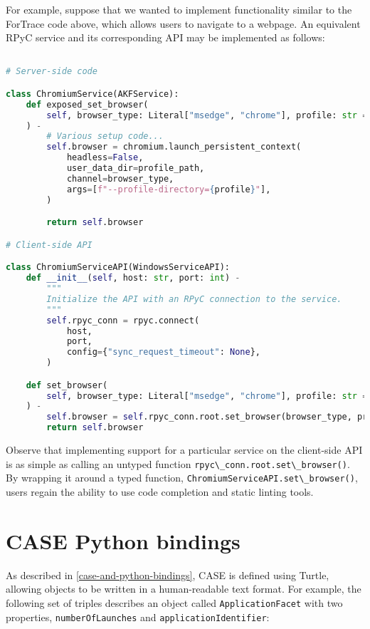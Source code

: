 \documentclass[letterpaper,12pt]{report}
\newcommand{\passthrough}[1]{#1}
\begin{document}
For example, suppose that we wanted to implement functionality similar
to the ForTrace code above, which allows users to navigate to a webpage.
An equivalent RPyC service and its corresponding API may be implemented
as follows:

\begin{lstlisting}[language=Python]

# Server-side code

class ChromiumService(AKFService):
    def exposed_set_browser(
        self, browser_type: Literal["msedge", "chrome"], profile: str = "Default"
    ) -
        # Various setup code...
        self.browser = chromium.launch_persistent_context(
            headless=False,
            user_data_dir=profile_path,
            channel=browser_type,
            args=[f"--profile-directory={profile}"],
        )

        return self.browser

# Client-side API

class ChromiumServiceAPI(WindowsServiceAPI):
    def __init__(self, host: str, port: int) -
        """
        Initialize the API with an RPyC connection to the service.
        """
        self.rpyc_conn = rpyc.connect(
            host,
            port,
            config={"sync_request_timeout": None},
        )

    def set_browser(
        self, browser_type: Literal["msedge", "chrome"], profile: str = "Default"
    ) -
        self.browser = self.rpyc_conn.root.set_browser(browser_type, profile)
        return self.browser
\end{lstlisting}

Observe that implementing support for a particular service on the
client-side API is as simple as calling an untyped function
\passthrough{\lstinline!rpyc\_conn.root.set\_browser()!}. By wrapping it
around a typed function,
\passthrough{\lstinline!ChromiumServiceAPI.set\_browser()!}, users
regain the ability to use code completion and static linting tools.

\section{CASE Python bindings}\label{case-python-bindings}

As described in \autoref{case-and-python-bindings}, CASE is defined using Turtle, allowing objects to be
written in a human-readable text format. For example, the following set
of triples describes an object called
\passthrough{\lstinline!ApplicationFacet!} with two properties,
\passthrough{\lstinline!numberOfLaunches!} and
\passthrough{\lstinline!applicationIdentifier!}:
\end{document}
